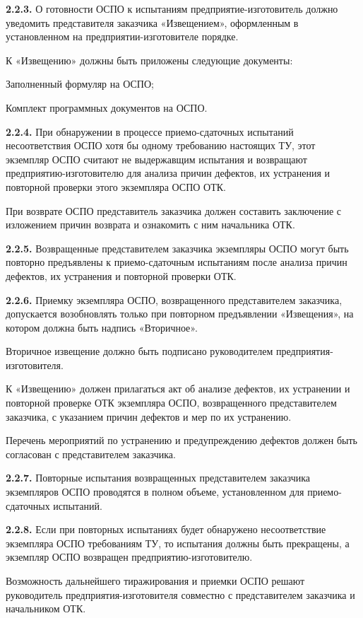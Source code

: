 \documentclass[11pt,a4paper]{article}
\begin{document}
\par\textbf{2.2.3.} О готовности ОСПО к испытаниям предприятие-изготовитель должно уведомить представителя заказчика «Извещением», оформленным в установленном на предприятии-изготовителе порядке.\par
К «Извещению» должны быть приложены следующие документы:

Заполненный формуляр на ОСПО;

Комплект программных документов на ОСПО.

\par\textbf{2.2.4.} При обнаружении в процессе приемо-сдаточных испытаний несоответствия ОСПО хотя бы одному требованию настоящих ТУ, этот экземпляр ОСПО считают не выдержавщим испытания и возвращают предприятию-изготовителю для анализа причин дефектов, их устранения и повторной проверки этого экземпляра ОСПО ОТК.\par
При возврате ОСПО представитель заказчика должен составить заключение с изложением причин возврата и ознакомить с ним начальника ОТК.

\par\textbf{2.2.5.} Возвращенные представителем заказчика экземпляры ОСПО могут быть повторно предъявлены к приемо-сдаточным испытаниям после анализа причин дефектов, их устранения и повторной проверки ОТК.\par
\par\textbf{2.2.6.} Приемку экземпляра ОСПО, возвращенного представителем заказчика, допускается возобновлять только при повторном предъявлении «Извещения», на котором должна быть надпись «Вторичное».\par
Вторичное извещение должно быть подписано руководителем предприятия-изготовителя.

К «Извещению» должен прилагаться акт об анализе дефектов, их устранении и повторной проверке ОТК экземпляра ОСПО, возвращенного представителем заказчика, с указанием причин дефектов и мер по их устранению.

Перечень мероприятий по устранению и предупреждению дефектов должен быть согласован с представителем заказчика.

\par\textbf{2.2.7.} Повторные испытания возвращенных представителем заказчика экземпляров ОСПО проводятся в полном объеме, установленном для приемо-сдаточных испытаний.\par
\par\textbf{2.2.8.} Если при повторных испытаниях будет обнаружено несоответствие экземпляра ОСПО требованиям ТУ, то испытания должны быть прекращены, а экземпляр ОСПО возвращен предприятию-изготовителю.\par
Возможность дальнейшего тиражирования и приемки ОСПО решают руководитель предприятия-изготовителя совместно с представителем заказчика и начальником ОТК.
\end{document}
